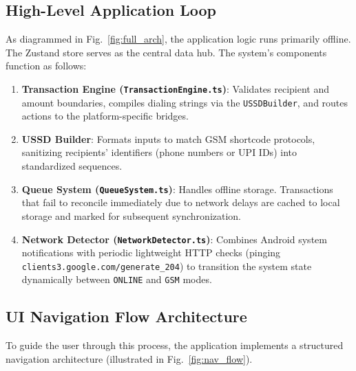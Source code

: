 \documentclass[10pt,journal,compsoc]{IEEEtran}
\begin{document}
\subsection{High-Level Application Loop}
As diagrammed in Fig.~\ref{fig:full_arch}, the application logic runs primarily offline. The Zustand store serves as the central data hub. The system's components function as follows:
\begin{enumerate}
    \item \textbf{Transaction Engine (\texttt{TransactionEngine.ts})}: Validates recipient and amount boundaries, compiles dialing strings via the \texttt{USSDBuilder}, and routes actions to the platform-specific bridges.
    \item \textbf{USSD Builder}: Formats inputs to match GSM shortcode protocols, sanitizing recipients' identifiers (phone numbers or UPI IDs) into standardized sequences.
    \item \textbf{Queue System (\texttt{QueueSystem.ts})}: Handles offline storage. Transactions that fail to reconcile immediately due to network delays are cached to local storage and marked for subsequent synchronization.
    \item \textbf{Network Detector (\texttt{NetworkDetector.ts})}: Combines Android system notifications with periodic lightweight HTTP checks (pinging \texttt{clients3.google.com/generate\_204}) to transition the system state dynamically between \texttt{ONLINE} and \texttt{GSM} modes.
\end{enumerate}

\subsection{UI Navigation Flow Architecture}
To guide the user through this process, the application implements a structured navigation architecture (illustrated in Fig.~\ref{fig:nav_flow}).
\end{document}
